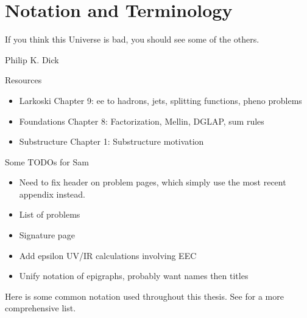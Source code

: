 \section*{Notation and Terminology}


\epigraph{If you think this Universe is bad, you should see some of the others.}{Philip K. Dick}


\begin{sambox}{Resources}{}
    \begin{itemize}
        \item
            Larkoski Chapter 9:
            ee to hadrons, jets, splitting functions, pheno problems

        \item
            Foundations Chapter 8:
            Factorization, Mellin, DGLAP, sum rules

        \item
            Substructure Chapter 1:
            Substructure motivation
    \end{itemize}
\end{sambox}

\begin{sambox}{Some TODOs for Sam}{}
    \begin{itemize}
        \item
            Need to fix header on problem pages, which simply use the most recent appendix instead.

        \item
            List of problems

        \item
            Signature page

        \item
            Add epsilon UV/IR calculations involving EEC

        \item
            Unify notation of epigraphs, probably want names then titles
    \end{itemize}
\end{sambox}

Here is some common notation used throughout this thesis.
%
See  for a more comprehensive list.

